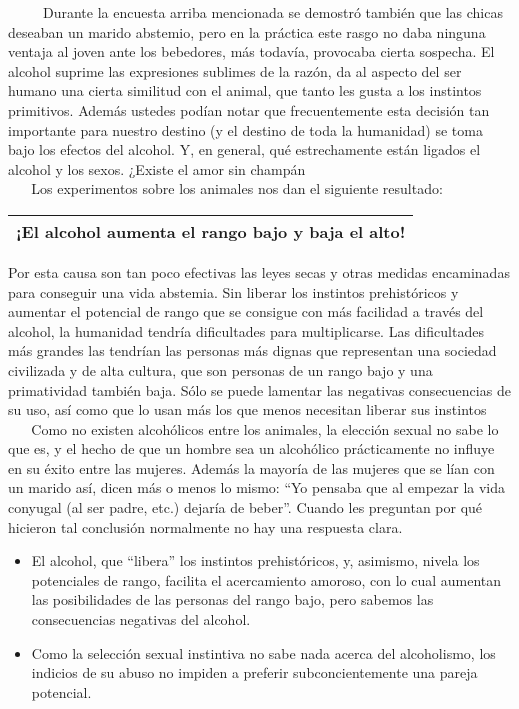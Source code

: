 ~ ~ ~ Durante la encuesta arriba mencionada se demostró también que las
chicas deseaban un marido abstemio, pero en la práctica este rasgo no
daba ninguna ventaja al joven ante los bebedores, más todavía, provocaba
cierta sospecha. El alcohol suprime las expresiones sublimes de la
razón, da al aspecto del ser humano una cierta similitud con el animal,
que tanto les gusta a los instintos primitivos. Además ustedes podían
notar que frecuentemente esta decisión tan importante para nuestro
destino (y el destino de toda la humanidad) se toma bajo los efectos del
alcohol. Y, en general, qué estrechamente están ligados el alcohol y los
sexos. ¿Existe el amor sin champán\\
\hspace*{0.333em} ~ ~ Los experimentos sobre los animales nos dan el
siguiente resultado:

\begin{longtable}[]{@{}l@{}}
\toprule
¡El alcohol aumenta el rango bajo y baja el alto!\tabularnewline
\bottomrule
\end{longtable}

Por esta causa son tan poco efectivas las leyes secas y otras medidas
encaminadas para conseguir una vida abstemia. Sin liberar los instintos
prehistóricos y aumentar el potencial de rango que se consigue con más
facilidad a través del alcohol, la humanidad tendría dificultades para
multiplicarse. Las dificultades más grandes las tendrían las personas
más dignas que representan una sociedad civilizada y de alta cultura,
que son personas de un rango bajo y una primatividad también baja. Sólo
se puede lamentar las negativas consecuencias de su uso, así como que lo
usan más los que menos necesitan liberar sus instintos\\
\hspace*{0.333em} ~ ~ Como no existen alcohólicos entre los animales, la
elección sexual no sabe lo que es, y el hecho de que un hombre sea un
alcohólico prácticamente no influye en su éxito entre las mujeres.
Además la mayoría de las mujeres que se lían con un marido así, dicen
más o menos lo mismo: ``Yo pensaba que al empezar la vida conyugal (al
ser padre, etc.) dejaría de beber''. Cuando les preguntan por qué
hicieron tal conclusión normalmente no hay una respuesta clara.

\begin{itemize}
\tightlist
\item
  El alcohol, que ``libera'' los instintos prehistóricos, y, asimismo,
  nivela los potenciales de rango, facilita el acercamiento amoroso, con
  lo cual aumentan las posibilidades de las personas del rango bajo,
  pero sabemos las consecuencias negativas del alcohol.
\item
  Como la selección sexual instintiva no sabe nada acerca del
  alcoholismo, los indicios de su abuso no impiden a preferir
  subconcientemente una pareja potencial.
\end{itemize}

